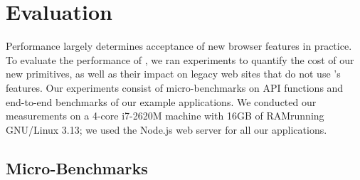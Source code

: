 \section{Evaluation}
\label{sec:eval}

Performance largely determines acceptance of new browser features
in practice.
%
To evaluate the performance of \sys{}, we ran experiments to quantify
the cost of our new primitives, as well as their impact on legacy web
sites that do not use \sys{}'s features.
%
Our experiments consist of micro-benchmarks on API functions and
end-to-end benchmarks of our example applications.
%
We conducted our measurements on a 4-core i7-2620M machine with 16GB
of RAM\@ running GNU/Linux 3.13; we used the Node.js web server for
all our applications.

\subsection{Micro-Benchmarks}
\label{sec:eval:micro}

\newcommand*\rot{\rotatebox{90}}

